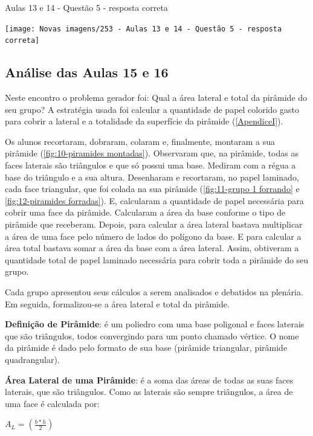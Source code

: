 \begin{CenteredFigure}
    \caption{Aulas 13 e 14 - Questão 5 - resposta correta} \label{fig: 253 - Aulas 13 e 14 - Questao 5 - resposta correta}
    \texttt{[image: Novas imagens/253 - Aulas 13 e 14 - Questão 5 - resposta correta]}
    \legend{\autoria}
\end{CenteredFigure}

\subsection{Análise das Aulas 15 e 16}

Neste encontro o problema gerador foi: Qual a área lateral e total da pirâmide do seu grupo? A estratégia usada foi calcular a quantidade de papel colorido gasto para cobrir a lateral e a totalidade da superfície da pirâmide (\autoref{ApendiceI}).

Os alunos recortaram, dobraram, colaram e, finalmente, montaram a sua pirâmide (\autoref{fig:10-piramides montadas}). Observaram que, na pirâmide, todas as faces laterais são triângulos e que só possui uma base. Mediram com a régua a base do triângulo e a sua altura. Desenharam e recortaram, no papel laminado, cada face triangular, que foi colada na sua pirâmide (\autoref{fig:11-grupo 1 forrando} e \autoref{fig:12-piramides forradas}).  E, calcularam a quantidade de papel necessária para cobrir uma face da pirâmide. Calcularam a área da base conforme o tipo de pirâmide que receberam. Depois, para calcular a área lateral bastava multiplicar a área de uma face pelo número de lados do polígono da base. E para calcular a área total bastava somar a área da base com a área lateral. Assim, obtiveram a quantidade total de papel laminado necessária para cobrir toda a pirâmide do seu grupo.

Cada grupo apresentou seus cálculos a serem analisados e debatidos na plenária. Em seguida, formalizou-se a área lateral e total da pirâmide.

\textbf{Definição de Pirâmide}: é um poliedro com uma base poligonal e faces laterais que são triângulos, todos convergindo para um ponto chamado vértice. O nome da pirâmide é dado pelo formato de sua base (pirâmide triangular, pirâmide quadrangular).

\textbf{Área Lateral de uma Pirâmide}: é a soma das áreas de todas as suas faces laterais, que são triângulos. Como as laterais são sempre triângulos, a área de uma face é calculada por:

\textcolor[HTML]{0000FF}{$A_L = \left( \frac{b*h}{2}  \right)$}

